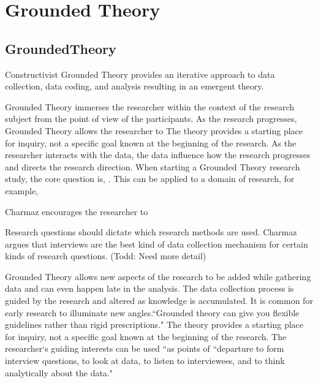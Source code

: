 
\chapter{Grounded Theory}
\section{GroundedTheory}

Constructivist Grounded Theory \cite{Charmaz} provides an iterative approach to data collection, data coding, and analysis resulting in an emergent theory. 

Grounded Theory immerses the researcher within the context of the research subject from the point of view of the participants. As the research progresses, Grounded Theory allows the researcher to  The theory provides a starting place for inquiry, not a specific goal known at the beginning of the research. As the researcher interacts with the data, the data influence how the research progresses and directs the research direction. When starting a Grounded Theory research study, the core question is,  \cite{GlaserTheoreticalSensitivity}. This can be applied to a domain of research, for example, 

Charmaz encourages the researcher to 

Research questions should dictate which research methods are used. Charmaz argues that interviews are the best kind of data collection mechanism for certain kinds of research questions. (Todd: Need more detail)

Grounded Theory allows new aspects of the research to be added while gathering data and can even happen late in the analysis. The data collection process is guided by the research and altered as knowledge is accumulated. It is common for early research to illuminate new angles.``Grounded theory can give you flexible guidelines rather than rigid prescriptions." The theory provides a starting place for inquiry, not a specific goal known at the beginning of the research. The researcher`s guiding interests can be used ``as points of  ``departure to form interview questions, to look at data, to listen to interviewees, and to think analytically about the data."

